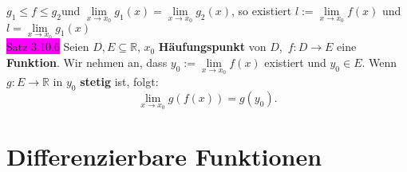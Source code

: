 \documentclass[landscape, 10pt]{article}
\newcommand{\R}{\mathbb{R}}
\begin{document}
\begin{multicols}{3}
{                            $g_1\leqslant f\leqslant g_2$}und 
                            \textcolor{NavyBlue}{
                            $\lim\limits_{x\to x_0}g_1(x)
                            =\lim\limits_{x\to x_0}g_2(x)$}, 
                            so existiert 
                            \textcolor{NavyBlue}{
                            $l:=\lim\limits_{x\to x_0}f(x)$} 
                            und \textcolor{NavyBlue}{
                            $l=\lim\limits_{x\to x_0}g_1(x)$}\\
              \colorbox{magenta}{Satz 3.10.6} 
                     Seien \textcolor{NavyBlue}{
                     $D,E\subseteq\R,\,x_0$} 
                     \textbf{Häufungspunkt} von 
                     \textcolor{NavyBlue}{$D$},\,
                     \textcolor{NavyBlue}{$f:D\longrightarrow E$} 
                     eine \textbf{Funktion}. Wir nehmen an, dass 
                     \textcolor{NavyBlue}{
                     $y_0:=\lim\limits_{x\to x_0}f(x)$} 
                     existiert und 
                     \textcolor{NavyBlue}{$y_0\in E$}. Wenn 
                     \textcolor{NavyBlue}{
                     $g:E\longrightarrow\R$} in 
                     \textcolor{NavyBlue}{$y_0$} 
                     \textbf{stetig} ist, folgt: 
                     \begin{equation*}
                           \lim\limits_{x\to x_0}g(f(x))
                           =g(y_0). 
                     \end{equation*}

\section{Differenzierbare Funktionen}

\end{multicols}
\end{document}
